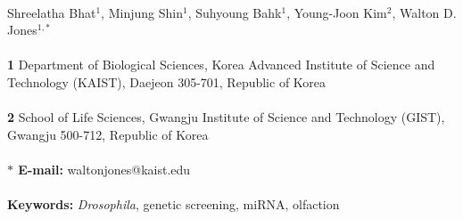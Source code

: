 \begin{flushleft}
\\
Shreelatha Bhat$^{1}$, 
Minjung Shin$^{1}$, 
Suhyoung Bahk$^{1}$, 
Young-Joon Kim$^{2}$, 
Walton D. Jones$^{1,\ast}$
\\
\\
{\bf 1} Department of Biological Sciences, Korea Advanced Institute of Science and Technology (KAIST), Daejeon 305-701, Republic of Korea
\\
\\
{\bf 2} School of Life Sciences, Gwangju Institute of Science and Technology (GIST), Gwangju 500-712, Republic of Korea
\\
\\
{\bf $\ast$ E-mail:} waltonjones@kaist.edu
\\
\\
{\bf Keywords:} \emph{Drosophila}, genetic screening, miRNA, olfaction
\end{flushleft}
